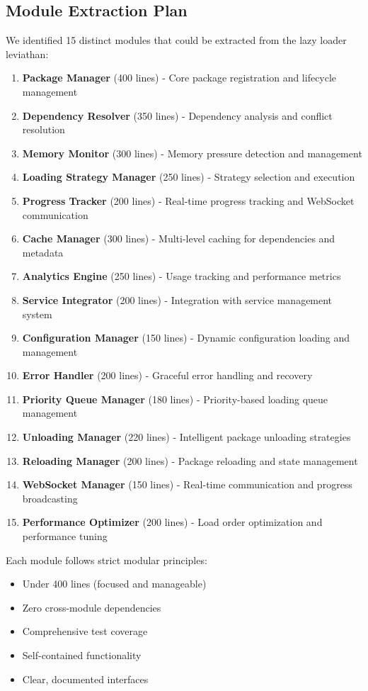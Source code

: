 \documentclass[11pt]{article}
\begin{document}
\subsection{Module Extraction Plan}

We identified 15 distinct modules that could be extracted from the lazy loader leviathan:

\begin{enumerate}
\item \textbf{Package Manager} (400 lines) - Core package registration and lifecycle management
\item \textbf{Dependency Resolver} (350 lines) - Dependency analysis and conflict resolution
\item \textbf{Memory Monitor} (300 lines) - Memory pressure detection and management
\item \textbf{Loading Strategy Manager} (250 lines) - Strategy selection and execution
\item \textbf{Progress Tracker} (200 lines) - Real-time progress tracking and WebSocket communication
\item \textbf{Cache Manager} (300 lines) - Multi-level caching for dependencies and metadata
\item \textbf{Analytics Engine} (250 lines) - Usage tracking and performance metrics
\item \textbf{Service Integrator} (200 lines) - Integration with service management system
\item \textbf{Configuration Manager} (150 lines) - Dynamic configuration loading and management
\item \textbf{Error Handler} (200 lines) - Graceful error handling and recovery
\item \textbf{Priority Queue Manager} (180 lines) - Priority-based loading queue management
\item \textbf{Unloading Manager} (220 lines) - Intelligent package unloading strategies
\item \textbf{Reloading Manager} (200 lines) - Package reloading and state management
\item \textbf{WebSocket Manager} (150 lines) - Real-time communication and progress broadcasting
\item \textbf{Performance Optimizer} (200 lines) - Load order optimization and performance tuning
\end{enumerate}

Each module follows strict modular principles:
\begin{itemize}
\item Under 400 lines (focused and manageable)
\item Zero cross-module dependencies
\item Comprehensive test coverage
\item Self-contained functionality
\item Clear, documented interfaces
\end{itemize}
\end{document}
